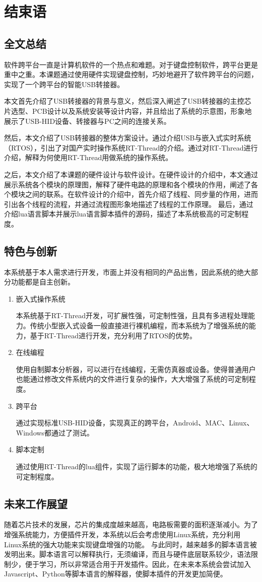 
\chapter{结束语}
\section{全文总结}
软件跨平台一直是计算机软件的一个热点和难题。对于键盘控制软件，跨平台更是重中之重。本课题通过使用硬件实现键盘控制，巧妙地避开了软件跨平台的问题，实现了一个跨平台的智能USB转接器。

本文首先介绍了USB转接器的背景与意义，然后深入阐述了USB转接器的主控芯片选型、PCB设计以及系统安装等设计内容，并且给出了系统的示意图，形象地展示了USB-HID设备、转接器与PC之间的连接关系。

然后，本文介绍了USB转接器的整体方案设计。通过介绍USB与嵌入式实时系统（RTOS），引出了对国产实时操作系统RT-Thread的介绍。通过对RT-Thread进行介绍，解释为何使用RT-Thread用做系统的操作系统。

之后，本文介绍了本课题的硬件设计与软件设计。在硬件设计的介绍中，本文通过展示系统各个模块的原理图，解释了硬件电路的原理和各个模块的作用，阐述了各个模块之间的联系。在软件设计的介绍中，首先介绍了线程、同步量的作用，进而引出各个线程的流程，并通过流程图形象地描述了线程的工作原理。
最后，通过介绍lua语言脚本并展示lua语言脚本插件的源码，描述了本系统极高的可定制程度。

\section{特色与创新}
本系统基于本人需求进行开发，市面上并没有相同的产品出售，因此系统的绝大部分功能都是自主创新。
\begin{enumerate}
\item 嵌入式操作系统

本系统基于RT-Thread开发，可扩展性强，可定制性强，且具有多进程处理能力。传统小型嵌入式设备一般直接进行裸机编程，而本系统为了增强系统的能力，基于RT-Thread进行开发，充分利用了RTOS的优势。
\item 在线编程

使用自制脚本分析器，可以进行在线编程，无需仿真器或设备。使得普通用户也能通过修改文件系统内的文件进行复杂的操作，大大增强了系统的可定制程度。
\item 跨平台


通过实现标准USB-HID设备，实现真正的跨平台，Android、MAC、Linux、Windows都通过了测试。

\item 脚本定制

通过使用RT-Thread的lua组件，实现了运行脚本的功能，极大地增强了系统的可定制程度。
\end{enumerate}


\section{未来工作展望}
随着芯片技术的发展，芯片的集成度越来越高，电路板需要的面积逐渐减小。为了增强系统能力，方便插件开发，本系统以后会考虑使用Linux系统，充分利用Linux系统的强大功能来实现键盘增强的功能。
与此同时，越来越多的脚本语言被发明出来。脚本语言可以解释执行，无须编译，而且与硬件底层联系较少，语法限制少，便于学习，所以非常适合用于开发插件。因此，在未来本系统会尝试加入Javascript、Python等脚本语言的解释器，使脚本插件的开发更加简便。





